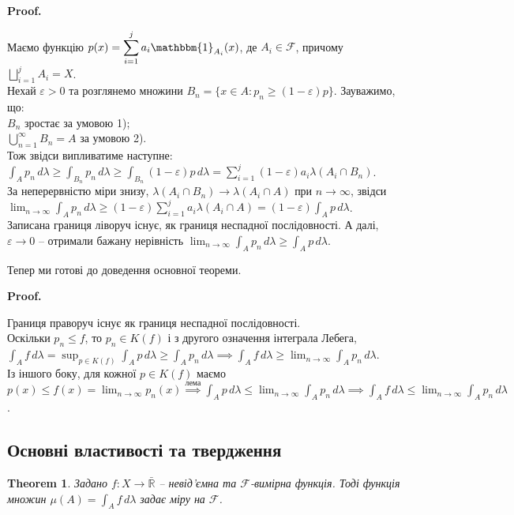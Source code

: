 \documentclass[a4paper, 10pt]{article}
\makeatletter
\theoremstyle{theoremdd}
\newtheorem{theorem}{Theorem}[subsection]
\renewenvironment{proof}[1][Proof.\\]{\par
\pushQED{\hfill \qed}%
\normalfont \topsep6\p@\@plus6\p@\relax
\trivlist
\item\relax
{\bfseries
#1\@addpunct{.}}\hspace\labelsep\ignorespaces
}{%
\popQED\endtrivlist\@endpefalse
}
\makeatother
\begin{document}
\begin{proof}
Маємо функцію $p(x) = \displaystyle\sum_{i=1}^j a_i \mathbbm{1}_{A_i}(x)$, де $A_i \in \mathcal{F}$, причому $\displaystyle\bigsqcup_{i=1}^j A_i = X$.\\
Нехай $\varepsilon > 0$ та розглянемо множини $B_n = \{x \in A : p_n \geq (1-\varepsilon)p\}$. Зауважимо, що:\\
$B_n$ зростає за умовою 1);\\
$\displaystyle\bigcup_{n=1}^\infty B_n = A$ за умовою 2).\\
Тож звідси випливатиме наступне:\\
$\displaystyle\int_A p_n\,d\lambda \geq \int_{B_n} p_n\,d\lambda \geq \int_{B_n} (1-\varepsilon)p\,d\lambda = \sum_{i=1}^j (1-\varepsilon) a_i \lambda(A_i \cap B_n)$.\\
За неперервністю міри знизу, $\lambda(A_i \cap B_n) \to \lambda(A_i \cap A)$ при $n \to \infty$, звідси\\
$\displaystyle\lim_{n \to \infty} \int_A p_n\, d\lambda \geq (1-\varepsilon) \sum_{i=1}^j a_i \lambda(A_i \cap A) = (1-\varepsilon) \int_A p\,d\lambda$.\\
Записана границя ліворуч існує, як границя неспадної послідовності. А далі, $\varepsilon \to 0$ -- отримали бажану нерівність $\displaystyle\lim_{n \to \infty} \int_A p_n\,d\lambda \geq \int_A p\,d\lambda$.
\end{proof}

\noindent Тепер ми готові до доведення основної теореми.
\begin{proof}
Границя праворуч існує як границя неспадної послідовності.\\
Оскільки $p_n \leq f$, то $p_n \in K(f)$ і з другого означення інтеграла Лебега,\\
$\displaystyle\int_A f\,d\lambda = \sup_{p \in K(f)} \int_A p\,d\lambda \geq \int_A p_n\,d\lambda \implies \int_A f\,d\lambda \geq \lim_{n \to \infty} \int_A p_n\,d\lambda$.\\
Із іншого боку, для кожної $p \in K(f)$ маємо\\
$p(x) \leq f(x) = \displaystyle\lim_{n \to \infty} p_n(x) \overset{\text{лема}}{\implies} \int_A p\,d\lambda \leq \lim_{n \to \infty} \int_A p_n\,d\lambda \implies \int_A f\,d\lambda \leq \lim_{n \to \infty} \int_A p_n\,d\lambda$.
\end{proof}

\subsection{Основні властивості та твердження}
\begin{theorem}
Задано $f \colon X \to \bar{\mathbb{R}}$ -- невід'ємна та $\mathcal{F}$-вимірна функція. Тоді функція множин $\mu(A) = \displaystyle\int_A f\,d\lambda$ задає міру на $\mathcal{F}$.
\end{theorem}
\end{document}
